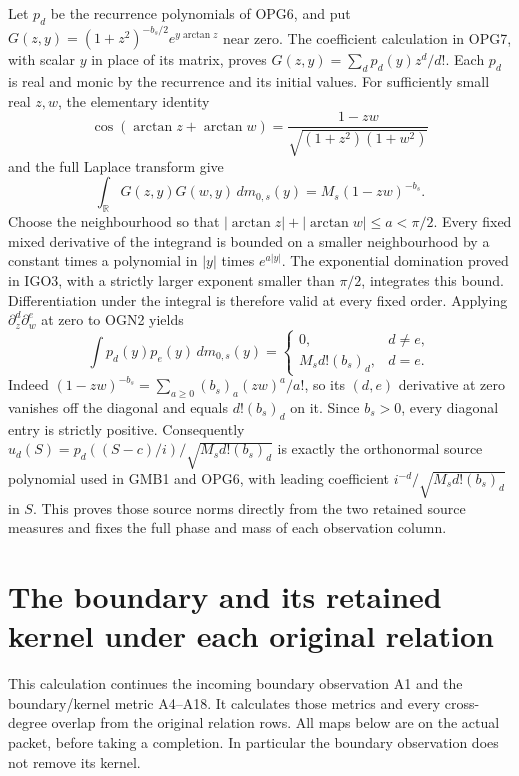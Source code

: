 \documentclass[11pt,a4paper]{article}
\begin{document}
Let $p_d$ be the recurrence polynomials of OPG6, and put
$G(z,y)=(1+z^2)^{-b_s/2}e^{y\arctan z}$ near zero. The
coefficient calculation in OPG7, with scalar $y$ in place of its
matrix, proves $G(z,y)=\sum_d p_d(y)z^d/d!$.
Each $p_d$ is real and monic by the recurrence and its initial
values. For sufficiently small real $z,w$, the elementary identity
\[
 \cos(\arctan z+\arctan w)
       =\frac{1-zw}{\sqrt{(1+z^2)(1+w^2)}}
\]
and the full Laplace transform give
\[
 \int_{\mathbb R}G(z,y)G(w,y)\,dm_{0,s}(y)
                  =M_s(1-zw)^{-b_s}.
 \tag{OGN2}
\]
Choose the neighbourhood so that
$|\arctan z|+|\arctan w|\leq a<\pi/2$.
Every fixed mixed derivative of the integrand is bounded on a
smaller neighbourhood by a constant times a polynomial in $|y|$
times $e^{a|y|}$. The exponential domination proved in IGO3,
with a strictly larger exponent smaller than $\pi/2$, integrates
this bound. Differentiation under the integral is therefore valid
at every fixed order. Applying $\partial_z^d\partial_w^e$ at zero
to OGN2 yields
\[
 \int p_d(y)p_e(y)\,dm_{0,s}(y)
  =\begin{cases}0,&d\ne e,\\
        M_s d!(b_s)_d,&d=e.
    \end{cases}
 \tag{OGN3}
\]
Indeed $(1-zw)^{-b_s}=\sum_{a\geq0}(b_s)_a(zw)^a/a!$,
so its $(d,e)$ derivative at zero vanishes off the diagonal and
equals $d!(b_s)_d$ on it. Since $b_s>0$, every diagonal entry
is strictly positive. Consequently
$u_d(S)=p_d((S-c)/i)/\sqrt{M_s d!(b_s)_d}$ is exactly the
orthonormal source polynomial used in GMB1 and OPG6, with
leading coefficient $i^{-d}/\sqrt{M_s d!(b_s)_d}$ in $S$.
This proves those source norms directly from the two retained
source measures and fixes the full phase and mass of each
observation column.



\section{The boundary and its retained kernel under each original relation}
\label{GraphV3:reader-v3-BRU:sec:bru-original-relations}

This calculation continues the incoming boundary observation A1 and the
boundary/kernel metric A4--A18. It calculates those metrics and every
cross-degree overlap from the original relation rows. All maps below are
on the actual packet, before taking a completion. In particular the
boundary observation does not remove its kernel.
\end{document}
